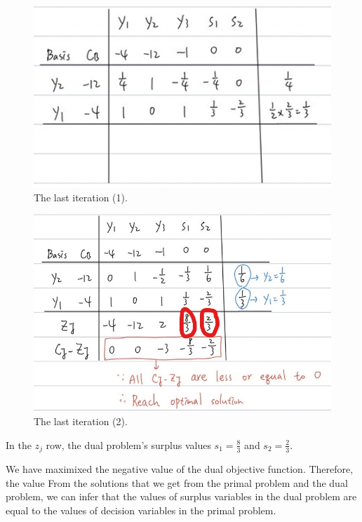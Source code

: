 \documentclass[a4paper,10pt]{article}
\begin{document}
\begin{enumerate}
\begin{enumerate}
{\begin{enumerate}
                \begin{figure}[H]
                    \centering
                    \includegraphics[scale=0.6]{./dual4.png}
                    \caption{The last iteration (1).}
                \end{figure}
                
                \begin{figure}[H]
                    \centering
                    \includegraphics[scale=0.4]{./dual5.jpeg}
                    \caption{The last iteration (2).}
                \end{figure}

                In the $z_j$ row, the dual problem's surplus values $s_1 = \frac{8}{3}$ and $s_2 = \frac{2}{3}$.
            \end{enumerate}

            We have maximixed the negative value of the dual objective function. Therefore, the value 
            From the solutions that we get from the primal problem and the dual problem, 
            we can infer that the values of surplus variables in the dual problem are equal to the values of decision variables in the primal problem.
        }


\end{enumerate}
\end{enumerate}
\end{document}
